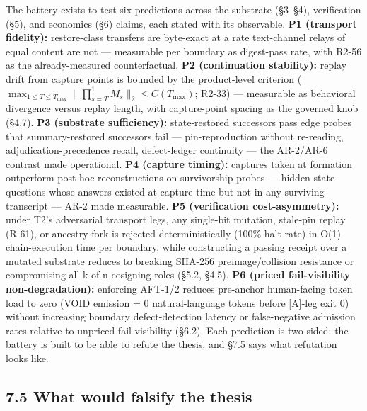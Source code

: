 \documentclass[11pt]{article}
\begin{document}
The battery exists to test six predictions across the substrate (\S{}3--\S{}4), verification (\S{}5), and economics (\S{}6) claims, each stated with its observable. \textbf{P1 (transport fidelity):} restore-class transfers are byte-exact at a rate text-channel relays of equal content are not --- measurable per boundary as digest-pass rate, with R2-56 as the already-measured counterfactual. \textbf{P2 (continuation stability):} replay drift from capture points is bounded by the product-level criterion (\(\max_{1\leq T\leq T_{\max}} \lVert\prod_{s=T}^{1} M_s\rVert_2 \leq C(T_{\max})\); R2-33) --- measurable as behavioral divergence versus replay length, with capture-point spacing as the governed knob (\S{}4.7). \textbf{P3 (substrate sufficiency):} state-restored successors pass edge probes that summary-restored successors fail --- pin-reproduction without re-reading, adjudication-precedence recall, defect-ledger continuity --- the AR-2/AR-6 contrast made operational. \textbf{P4 (capture timing):} captures taken at formation outperform post-hoc reconstructions on survivorship probes --- hidden-state questions whose answers existed at capture time but not in any surviving transcript --- AR-2 made measurable. \textbf{P5 (verification cost-asymmetry):} under T2's adversarial transport legs, any single-bit mutation, stale-pin replay (R-61), or ancestry fork is rejected deterministically (100\% halt rate) in O(1) chain-execution time per boundary, while constructing a passing receipt over a mutated substrate reduces to breaking SHA-256 preimage/collision resistance or compromising all k-of-n cosigning roles (\S{}5.2, \S{}4.5). \textbf{P6 (priced fail-visibility non-degradation):} enforcing AFT-1/2 reduces pre-anchor human-facing token load to zero (VOID emission = 0 natural-language tokens before {[}A{]}-leg exit 0) without increasing boundary defect-detection latency or false-negative admission rates relative to unpriced fail-visibility (\S{}6.2). Each prediction is two-sided: the battery is built to be able to refute the thesis, and \S{}7.5 says what refutation looks like.

\subsection{7.5 What would falsify the thesis}\label{what-would-falsify-the-thesis}
\end{document}
